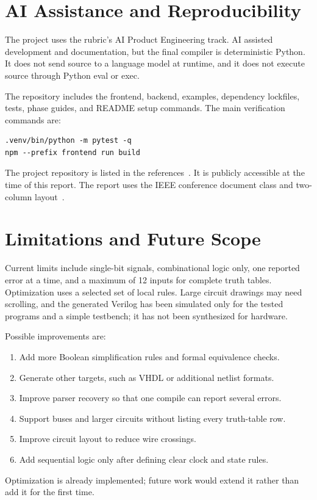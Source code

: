 \documentclass[conference]{IEEEtran}
\begin{document}
\section{AI Assistance and Reproducibility}
The project uses the rubric's AI Product Engineering track. AI assisted development and documentation, but the final compiler is deterministic Python. It does not send source to a language model at runtime, and it does not execute source through Python eval or exec.

The repository includes the frontend, backend, examples, dependency lockfiles, tests, phase guides, and README setup commands. The main verification commands are:
\begin{lstlisting}
.venv/bin/python -m pytest -q
npm --prefix frontend run build
\end{lstlisting}
The project repository is listed in the references~\cite{repo}. It is publicly accessible at the time of this report. The report uses the IEEE conference document class and two-column layout~\cite{ieee}.

\section{Limitations and Future Scope}
Current limits include single-bit signals, combinational logic only, one reported error at a time, and a maximum of 12 inputs for complete truth tables. Optimization uses a selected set of local rules. Large circuit drawings may need scrolling, and the generated Verilog has been simulated only for the tested programs and a simple testbench; it has not been synthesized for hardware.

Possible improvements are:
\begin{enumerate}
\item Add more Boolean simplification rules and formal equivalence checks.
\item Generate other targets, such as VHDL or additional netlist formats.
\item Improve parser recovery so that one compile can report several errors.
\item Support buses and larger circuits without listing every truth-table row.
\item Improve circuit layout to reduce wire crossings.
\item Add sequential logic only after defining clear clock and state rules.
\end{enumerate}
Optimization is already implemented; future work would extend it rather than add it for the first time.
\end{document}

